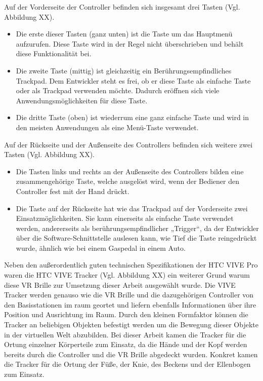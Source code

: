 \newline
Auf der Vorderseite der Controller befinden sich insgesamt drei Tasten (Vgl. Abbildung XX). 
\begin{itemize}
	\item Die erste dieser Tasten (ganz unten) ist die Taste um das Hauptmenü aufzurufen. Diese 
	Taste wird in der Regel nicht überschrieben und behält diese Funktionalität bei.
	\item Die zweite Taste (mittig) ist gleichzeitig ein Berührungsempfindliches Trackpad. Dem 
	Entwickler steht es frei, ob er diese Taste als einfache Taste oder als Trackpad verwenden 
	möchte. Dadurch eröffnen sich viele Anwendungsmöglichkeiten für diese Taste.
	\item Die dritte Taste (oben) ist wiederrum eine ganz einfache Taste und wird in den meisten 
	Anwendungen als eine Menü-Taste verwendet.
\end{itemize}
Auf der Rückseite und der Außenseite des Controllers befinden sich weitere zwei Tasten (Vgl. Abbildung XX). 
\begin{itemize}
	\item Die Tasten links und rechts an der Außenseite des Controllers bilden eine 
	zusammengehörige Taste, welche ausgelöst wird, wenn der Bediener den Controller fest mit 
	der Hand drückt.
	\item Die Taste auf der Rückseite hat wie das Trackpad auf der Vorderseite zwei 
	Einsatzmöglichkeiten. Sie kann einerseits als einfache Taste verwendet werden, andererseits 
	als berührungsempfindlicher „Trigger“, da der Entwickler über die Software-Schnittstelle 
	auslesen kann, wie Tief die Taste reingedrückt wurde, ähnlich wie bei einem Gaspedal in
	einem Auto.
\end{itemize}
Neben den außerordentlich guten technischen Spezifikationen der HTC VIVE Pro waren die HTC VIVE Tracker (Vgl. Abbildung XX) ein weiterer Grund warum diese VR Brille zur Umsetzung dieser Arbeit ausgewählt wurde. Die VIVE Tracker werden genauso wie die VR Brille und die dazugehörigen Controller von den Basisstationen im raum geortet und liefern ebenfalls Informationen über ihre Position und Ausrichtung im Raum. Durch den kleinen Formfaktor können die Tracker an beliebigen Objekten befestigt werden um die Bewegung dieser Objekte in der virtuellen Welt abzubilden.
\newline
Bei dieser Arbeit kamen die Tracker für die Ortung einzelner Körperteile zum Einsatz, da die Hände und der Kopf werden bereits durch die Controller und die VR Brille abgedeckt wurden. Konkret kamen die Tracker für die Ortung der Füße, der Knie, des Beckens und der Ellenbogen zum Einsatz.
